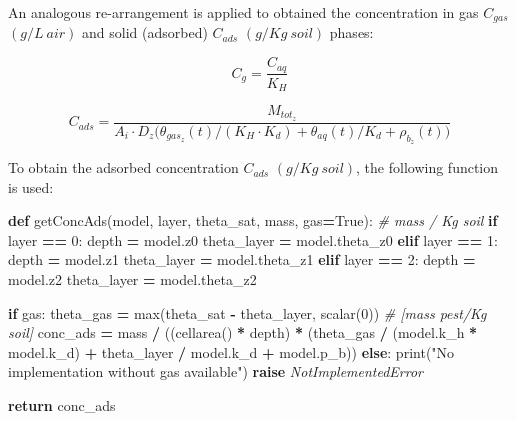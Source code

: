 \documentclass[]{article}
\newenvironment{Shaded}{\begin{snugshade}}{\end{snugshade}}
\newcommand{\KeywordTok}[1]{\textcolor[rgb]{0.13,0.29,0.53}{\textbf{{#1}}}}
\newcommand{\DecValTok}[1]{\textcolor[rgb]{0.00,0.00,0.81}{{#1}}}
\newcommand{\StringTok}[1]{\textcolor[rgb]{0.31,0.60,0.02}{{#1}}}
\newcommand{\CommentTok}[1]{\textcolor[rgb]{0.56,0.35,0.01}{\textit{{#1}}}}
\newcommand{\VariableTok}[1]{\textcolor[rgb]{0.00,0.00,0.00}{{#1}}}
\newcommand{\ControlFlowTok}[1]{\textcolor[rgb]{0.13,0.29,0.53}{\textbf{{#1}}}}
\newcommand{\OperatorTok}[1]{\textcolor[rgb]{0.81,0.36,0.00}{\textbf{{#1}}}}
\newcommand{\BuiltInTok}[1]{{#1}}
\newcommand{\PreprocessorTok}[1]{\textcolor[rgb]{0.56,0.35,0.01}{\textit{{#1}}}}
\newcommand{\NormalTok}[1]{{#1}}
\begin{document}
An analogous re-arrangement is applied to obtained the concentration in
gas \(C_{gas}\) \((g/L~air)\) and solid (adsorbed) \(C_{ads}\)
\((g/Kg~soil)\) phases:

\begin{equation}
C_{g} = \frac{C_{aq}}{K_H} 
\label{eq:conc_gas}  
\end{equation}

\begin{equation}
C_{ads} = \frac{M_{tot_z} }{ A_i\cdot D_z \Big( \theta_{gas_z}(t)/(K_H \cdot K_d) + \theta_{aq}(t)/K_d + \rho_{b_z}(t)\Big)}
\label{eq:mass_tot_conc_aq2}  
\end{equation}

To obtain the adsorbed concentration \(C_{ads}\) \((g/Kg~soil)\), the
following function is used:

\begin{Shaded}
\begin{Highlighting}[]
\KeywordTok{def} \NormalTok{getConcAds(model, layer, theta_sat, mass, gas}\OperatorTok{=}\VariableTok{True}\NormalTok{):}
    \CommentTok{# mass / Kg soil}
    \ControlFlowTok{if} \NormalTok{layer }\OperatorTok{==} \DecValTok{0}\NormalTok{:}
        \NormalTok{depth }\OperatorTok{=} \NormalTok{model.z0}
        \NormalTok{theta_layer }\OperatorTok{=} \NormalTok{model.theta_z0}
    \ControlFlowTok{elif} \NormalTok{layer }\OperatorTok{==} \DecValTok{1}\NormalTok{:}
        \NormalTok{depth }\OperatorTok{=} \NormalTok{model.z1}
        \NormalTok{theta_layer }\OperatorTok{=} \NormalTok{model.theta_z1}
    \ControlFlowTok{elif} \NormalTok{layer }\OperatorTok{==} \DecValTok{2}\NormalTok{:}
        \NormalTok{depth }\OperatorTok{=} \NormalTok{model.z2}
        \NormalTok{theta_layer }\OperatorTok{=} \NormalTok{model.theta_z2}

    \ControlFlowTok{if} \NormalTok{gas:}
        \NormalTok{theta_gas }\OperatorTok{=} \BuiltInTok{max}\NormalTok{(theta_sat }\OperatorTok{-} \NormalTok{theta_layer, scalar(}\DecValTok{0}\NormalTok{))}
        \CommentTok{# [mass pest/Kg soil]}
        \NormalTok{conc_ads }\OperatorTok{=} \NormalTok{mass }\OperatorTok{/} \NormalTok{((cellarea() }\OperatorTok{*} \NormalTok{depth) }\OperatorTok{*}
                           \NormalTok{(theta_gas }\OperatorTok{/} \NormalTok{(model.k_h }\OperatorTok{*} \NormalTok{model.k_d) }\OperatorTok{+}
                            \NormalTok{theta_layer }\OperatorTok{/} \NormalTok{model.k_d }\OperatorTok{+}
                            \NormalTok{model.p_b))}
    \ControlFlowTok{else}\NormalTok{:}
        \BuiltInTok{print}\NormalTok{(}\StringTok{"No implementation without gas available"}\NormalTok{)}
        \ControlFlowTok{raise} \PreprocessorTok{NotImplementedError}

    \ControlFlowTok{return} \NormalTok{conc_ads}
\end{Highlighting}
\end{Shaded}
\end{document}
